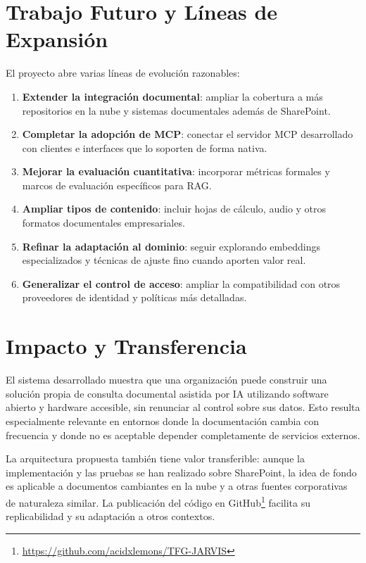 \section{Trabajo Futuro y Líneas de Expansión}

El proyecto abre varias líneas de evolución razonables:

\begin{enumerate}
    \item \textbf{Extender la integración documental}: ampliar la cobertura a más repositorios en la nube y sistemas documentales además de SharePoint.
    \item \textbf{Completar la adopción de MCP}: conectar el servidor MCP desarrollado con clientes e interfaces que lo soporten de forma nativa.
    \item \textbf{Mejorar la evaluación cuantitativa}: incorporar métricas formales y marcos de evaluación específicos para RAG.
    \item \textbf{Ampliar tipos de contenido}: incluir hojas de cálculo, audio y otros formatos documentales empresariales.
    \item \textbf{Refinar la adaptación al dominio}: seguir explorando embeddings especializados y técnicas de ajuste fino cuando aporten valor real.
    \item \textbf{Generalizar el control de acceso}: ampliar la compatibilidad con otros proveedores de identidad y políticas más detalladas.
\end{enumerate}

\section{Impacto y Transferencia}

El sistema desarrollado muestra que una organización puede construir una solución propia de consulta documental asistida por IA utilizando software abierto y hardware accesible, sin renunciar al control sobre sus datos. Esto resulta especialmente relevante en entornos donde la documentación cambia con frecuencia y donde no es aceptable depender completamente de servicios externos.

La arquitectura propuesta también tiene valor transferible: aunque la implementación y las pruebas se han realizado sobre SharePoint, la idea de fondo es aplicable a documentos cambiantes en la nube y a otras fuentes corporativas de naturaleza similar. La publicación del código en GitHub\footnote{\url{https://github.com/acidxlemons/TFG-JARVIS}} facilita su replicabilidad y su adaptación a otros contextos.
